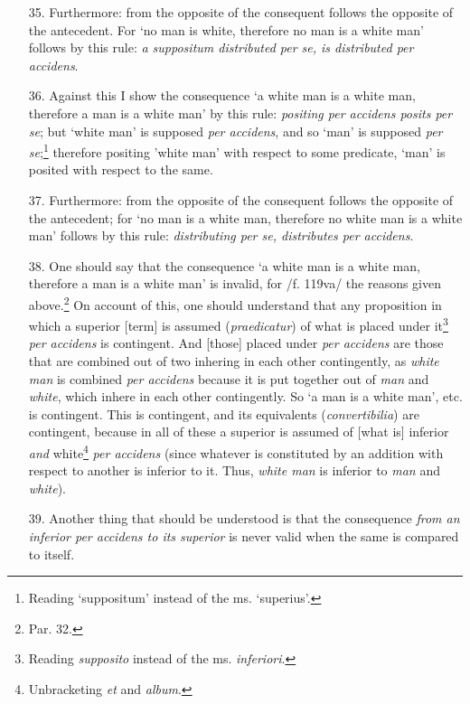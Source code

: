 \documentclass[]{article}
\begin{document}
\begin{enumerate}
\item[35.] Furthermore: from the opposite of the consequent follows the opposite of the antecedent. For `no man is white, therefore no man is a white man' follows by this rule: \textit{a suppositum distributed per se, is distributed per accidens}.
\item[36.] Against this I show the consequence `a white man is a white man, therefore a man is a white man' by this rule: \textit{positing per accidens posits per se}; but `white man' is supposed \textit{per accidens}, and so `man' is supposed \textit{per se};\footnote{Reading `suppositum' instead of the ms. `superius'.} therefore positing 'white man' with respect to some predicate, `man' is posited with respect to the same. 
\item[37.] Furthermore: from the opposite of the consequent follows the opposite of the antecedent; for `no man is a white man, therefore no white man is a white man' follows by this rule: \textit{distributing per se, distributes per accidens}.
\item[38.] One should say that the consequence `a white man is a white man, therefore a man is a white man' is invalid, for /f. 119va/ the reasons given above.\footnote{Par. 32.} On account of this, one should understand that any proposition in which a superior [term] is assumed (\textit{praedicatur}) of what is placed under it\footnote{Reading \textit{supposito} instead of the ms. \textit{inferiori}.} \textit{per accidens} is contingent. And [those] placed under \textit{per accidens} are those that are combined out of two inhering in each other contingently, as \textit{white man} is combined \textit{per accidens} because it is put together out of \textit{man} and \textit{white}, which inhere in each other contingently. So `a man is a white man', etc. is contingent. This is contingent, and its equivalents (\textit{convertibilia}) are contingent, because in all of these a superior is assumed of [what is] inferior \textit{and} white\footnote{Unbracketing \textit{et} and \textit{album}.} \textit{per accidens} (since whatever is constituted by an addition with respect to another is inferior to it. Thus, \textit{white man} is inferior to \textit{man} and \textit{white}).
\item[39.] Another thing that should be understood is that the consequence \textit{from an inferior \textit{per accidens} to its superior} is never valid when the same is compared to itself.

\end{enumerate}
\end{document}
